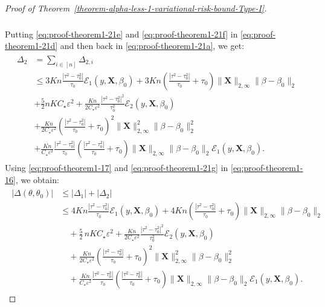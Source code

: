 \documentclass[12pt]{article}
\numberwithin{equation}{section}
\begin{document}
\begin{proof}[Proof of Theorem~\ref{theorem-alpha-less-1-variational-risk-bound-Type-I}]
\begin{align}
\begin{split}
    \end{split}
\end{align}
%
Putting \eqref{eq:proof-theorem1-21e} and \eqref{eq:proof-theorem1-21f} in \eqref{eq:proof-theorem1-21d} and then back in \eqref{eq:proof-theorem1-21a}, we get:
%
\begin{align}
    \begin{split} \label{eq:proof-theorem1-21g}
        \Delta_2 &= \sum_{i \in [n]}\Delta_{2,i} \\
        &\leq 3Kn \frac{|\tau^2-\tau_0^2|}{\tau_0}\mathcal{E}_1(y, \mathbf{X}, \beta_0) + 3Kn\left(\frac{|\tau^2-\tau_0^2|}{\tau_0} + \tau_0\right)\lVert\mathbf{X}\rVert_{2,\infty} \lVert\beta-\beta_0\rVert_2 \\
        & + \frac{5}{2} nKC_{\star}\varepsilon^2 +  \frac{Kn}{2C_{\star}\varepsilon^2}\frac{|\tau^2-\tau_0^2|^2}{\tau_0^2}\mathcal{E}_2(y, \mathbf{X}, \beta_0)  \\
        &+  \frac{Kn}{2C_{\star}\varepsilon^2}\left(\frac{|\tau^2-\tau_0^2|}{\tau_0} + \tau_0\right)^2\lVert\mathbf{X}\rVert_{2,\infty}^2 \lVert\beta-\beta_0\rVert_2^2 \\
        & + \frac{Kn}{C_{\star}\varepsilon^2}\frac{|\tau^2-\tau_0^2|}{\tau_0}\left(\frac{|\tau^2-\tau_0^2|}{\tau_0} + \tau_0\right)\lVert\mathbf{X}\rVert_{2,\infty} \lVert\beta-\beta_0\rVert_2\mathcal{E}_1(y, \mathbf{X}, \beta_0).
    \end{split}
\end{align}
%
Using \eqref{eq:proof-theorem1-17} and \eqref{eq:proof-theorem1-21g} in \eqref{eq:proof-theorem1-16}, we obtain:
%
\begin{align}\label{eq:proof-theorem1-23}
\begin{split}
|\Delta(\theta, \theta_0)|
&\leq |\Delta_1| + |\Delta_2|
\\
&\leq 4Kn \frac{|\tau^2-\tau_0^2|}{\tau_0}\mathcal{E}_1(y, \mathbf{X}, \beta_0)
+ 4Kn\left(\frac{|\tau^2-\tau_0^2|}{\tau_0} + \tau_0\right)
\lVert \mathbf{X}\rVert_{2,\infty}\lVert \beta-\beta_0\rVert_2
\\
&\quad + \frac{5}{2}\,nK  C_{\star}\varepsilon^2
+ \frac{Kn}{2 C_{\star}\varepsilon^2}\frac{|\tau^2-\tau_0^2|^2}{\tau_0^2}
\mathcal{E}_2(y, \mathbf{X}, \beta_0)
\\
&\quad + \frac{Kn}{2 C_{\star}\varepsilon^2}
\left(\frac{|\tau^2-\tau_0^2|}{\tau_0}+\tau_0\right)^2
\lVert \mathbf{X}\rVert_{2,\infty}^2 \lVert \beta-\beta_0\rVert_2^2
\\
&\quad + \frac{Kn}{C_{\star}\varepsilon^2}
\frac{|\tau^2-\tau_0^2|}{\tau_0}
\left(\frac{|\tau^2-\tau_0^2|}{\tau_0}+\tau_0\right)
\lVert \mathbf{X}\rVert_{2,\infty}\lVert \beta-\beta_0\rVert_2
\mathcal{E}_1(y, \mathbf{X}, \beta_0).
\end{split}
\end{align}
%


\end{proof}
\end{document}
